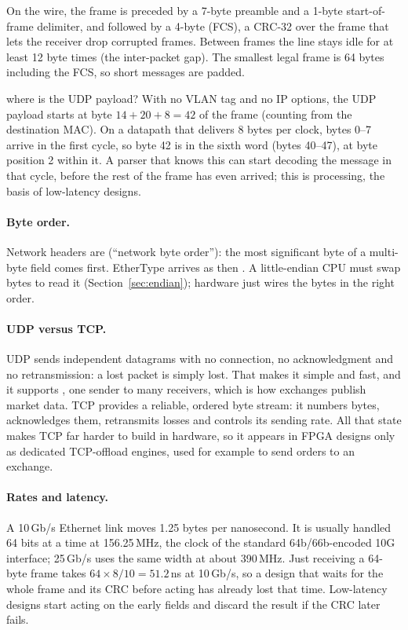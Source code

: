 On the wire, the frame is preceded by a 7-byte preamble and a 1-byte start-of-frame delimiter, and followed by a 4-byte  (FCS), a CRC-32 over the frame that lets the receiver drop corrupted frames. Between frames the line stays idle for at least 12 byte times (the inter-packet gap). The smallest legal frame is 64 bytes including the FCS, so short messages are padded.

\begin{worked}{where is the UDP payload?}
With no VLAN tag and no IP options, the UDP payload starts at byte $14 + 20 + 8 = 42$ of the frame (counting from the destination MAC). On a datapath that delivers 8 bytes per clock, bytes 0--7 arrive in the first cycle, so byte 42 is in the sixth word (bytes 40--47), at byte position 2 within it. A parser that knows this can start decoding the message in that cycle, before the rest of the frame has even arrived; this is  processing, the basis of low-latency designs.
\end{worked}

\paragraph{Byte order.} Network headers are  (``network byte order''): the most significant byte of a multi-byte field comes first. EtherType  arrives as  then . A little-endian CPU must swap bytes to read it (Section~\ref{sec:endian}); hardware just wires the bytes in the right order.

\paragraph{UDP versus TCP.} UDP sends independent datagrams with no connection, no acknowledgment and no retransmission: a lost packet is simply lost. That makes it simple and fast, and it supports , one sender to many receivers, which is how exchanges publish market data. TCP provides a reliable, ordered byte stream: it numbers bytes, acknowledges them, retransmits losses and controls its sending rate. All that state makes TCP far harder to build in hardware, so it appears in FPGA designs only as dedicated TCP-offload engines, used for example to send orders to an exchange.

\paragraph{Rates and latency.} A 10\,Gb/s Ethernet link moves 1.25 bytes per nanosecond. It is usually handled 64 bits at a time at 156.25\,MHz, the clock of the standard 64b/66b-encoded 10G interface; 25\,Gb/s uses the same width at about 390\,MHz. Just receiving a 64-byte frame takes $64 \times 8 / 10 = 51.2$\,ns at 10\,Gb/s, so a design that waits for the whole frame and its CRC before acting has already lost that time. Low-latency designs start acting on the early fields and discard the result if the CRC later fails.

